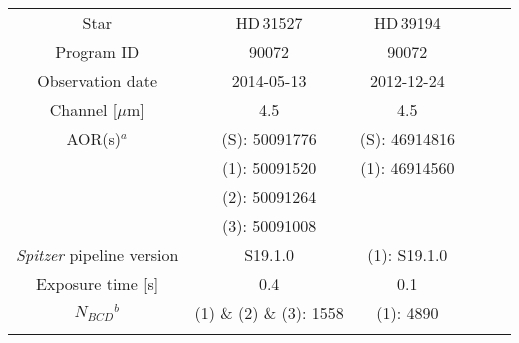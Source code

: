 \documentclass[traditabstract]{aa}
\begin{document}
\begin{appendix}
\begin{table*}
\begin{center}
{\scriptsize
\label{tab:targets}
\begin{tabular}{cccccc}
\hline\noalign {\smallskip}
Star &  HD\,31527  & HD\,39194& &    \\ \noalign {\smallskip}
\hline \noalign {\smallskip}  
Program ID                                                          & 90072                                                  &  90072                       \\ \noalign {\smallskip} 
Observation date                                                 & 2014-05-13                                  &  2012-12-24                \\ \noalign {\smallskip} 
Channel       [$\mu$m]                                         & 4.5                                                       & 4.5                              \\ \noalign {\smallskip} 
AOR(s)$^a$                                                        & (S): 50091776                            & (S): 46914816             \\ \noalign {\smallskip}                                                                                      
                                                                           & (1): 50091520                         &  (1): 46914560             \\ \noalign {\smallskip} 
                                                                           & (2): 50091264                                          &                                      \\ \noalign {\smallskip} 
                                                                           & (3): 50091008                                      &                                        \\ \noalign {\smallskip}                                                                
{\it Spitzer} pipeline version                               & S19.1.0                                             & (1): S19.1.0                  \\ \noalign {\smallskip}     
Exposure time [s]                                               & 0.4                                                          & 0.1                               \\ \noalign {\smallskip} 
$N_{BCD}$$^b$                                                & (1) \& (2) \& (3): 1558                                           & (1): 4890                     \\ \noalign {\smallskip} 
$$
\end{tabular}}
\end{center}
\end{table*}
\end{appendix}
\end{document}
